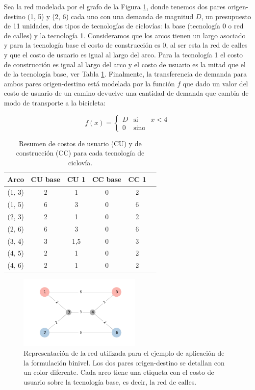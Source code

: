 Sea la red modelada por el grafo de la Figura \ref{fig:example1base}, donde tenemos dos pares origen-destino (1, 5) y (2, 6) cada uno con una demanda de magnitud $D$, un presupuesto de 11 unidades, dos tipos de tecnologías de ciclovías: la base (tecnología 0 o red de calles) y la tecnología 1. Consideramos que los arcos tienen un largo asociado y para la tecnología base el costo de construcción es 0, al ser esta la red de calles y que el costo de usuario es igual al largo del arco. Para la tecnología 1 el costo de construcción es igual al largo del arco y el costo de usuario es la mitad que el de la tecnología base, ver Tabla \ref{table:example1arccosts}. Finalmente, la transferencia de demanda para ambos pares origen-destino está modelada por la función $f$ que dado un valor del costo de usuario de un camino devuelve una cantidad de demanda que cambia de modo de transporte a la bicicleta:

$$
  f(x) = \left\{ \begin{array}{lcr}
          D & \mbox{si}   & x < 4 \\
          0 & \mbox{sino} &
  \end{array}
  \right.
$$

\begin{table}[h!]
  \centering
  \begin{tabular}{cccccc}
    \toprule
    Arco & CU base & CU 1 & CC base & CC 1 & \\
    \midrule
      (1, 3) & 2 & 1   & 0 & 2 \\
      (1, 5) & 6 & 3   & 0 & 6 \\
      (2, 3) & 2 & 1   & 0 & 2 \\
      (2, 6) & 6 & 3   & 0 & 6 \\
      (3, 4) & 3 & 1,5 & 0 & 3 \\
      (4, 5) & 2 & 1   & 0 & 2 \\
      (4, 6) & 2 & 1   & 0 & 2 \\
    \bottomrule
  \end{tabular}
    \caption{Resumen de costos de usuario (CU) y de construcción (CC) para cada tecnología de ciclovía.}\label{table:example1arccosts}
\end{table}

\begin{figure}[h!]
  \centering
  \includegraphics[width=6cm]{../resources/example_1_base.png}
  \caption{Representación de la red utilizada para el ejemplo de aplicación de la formulación binivel. Los dos pares origen-destino se detallan con un color diferente. Cada arco tiene una etiqueta con el costo de usuario sobre la tecnología base, es decir, la red de calles.}
  \label{fig:example1base}
\end{figure}

